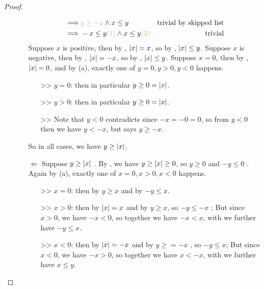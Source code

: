 \begin{proof}
\begin{enumerate}
\begin{itemize}
\begin{align*}
                    \implies & \GREEN{y \ge -x} \land x \le y & \text{trivial by skipped list} \\
                    \implies & -x \le y \GREEN{ (1)} \land x \le y \GREEN{ (2)} & \text{trivial} \\
                \end{align*}
                Suppose \(x\) is positive, then by , \(\lvert x\rvert = x\), so by , \(\lvert x\rvert \le y\).
                Suppose \(x\) is negative, then by , \(\lvert x\rvert = -x\), so by , \(\lvert x\rvert \le y\).
                Suppose \(x = 0\), then by , \(\lvert x\rvert = 0\), and by (a), exactly one of \(y = 0, y > 0, y < 0\) happens.
                    \begin{itemize}
                        \item[>>] \(y = 0\): then in particular \(y \ge 0 = \lvert x\rvert\).
                        \item[>>] \(y > 0\): then in particular \(y \ge 0 = \lvert x\rvert\).
                        \item[>>] Note that \(y < 0\) contradicts  since \(-x = -0 = 0\), so from \(y < 0\) then we have \(y < -x\), but  says \(y \ge -x\).
                    \end{itemize}
                So in all cases, we have \(y \ge \lvert x\rvert\).
            \item [\(\Longleftarrow\)]
                Suppose \(y \ge \lvert x\rvert\) .
                By , we have \(y \ge \lvert x\rvert \ge 0\), so \(y \ge 0\)  and \(-y \le 0\) .
                Again by (a), exactly one of \(x = 0, x > 0, x < 0\) happens.
                \begin{itemize}
                    \item[>>] \(x = 0\): then by  \(y \ge x\) and by  \(-y \le x\).
                    \item[>>] \(x > 0\): then by  \(\lvert x\rvert = x\) and by  \(y \ge x\), so \(-y \le -x\) ;
                        But since \(x > 0\), we have \(-x < 0\), so together we have \(-x < x\), with  we further have \(-y \le x\).
                    \item[>>] \(x < 0\): then by  \(\lvert x\rvert = -x\) and by  \(y \ge = -x\) , so \(-y \le x\);
                        But since \(x < 0\), we have \(-x > 0\), so together we have \(x < -x\), with  we further have \(x \le y\).

\end{itemize}
\end{itemize}
\end{enumerate}
\end{proof}
